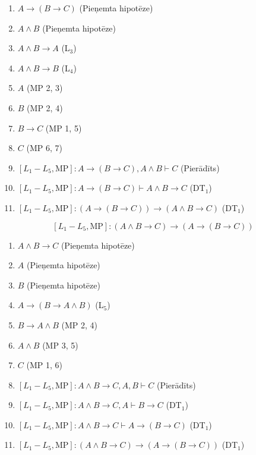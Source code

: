 \documentclass{article}
\begin{document}
\begin{enumerate}
    \item $ A \rightarrow (B \rightarrow C) $ \hfill (Pieņemta hipotēze)
    \item $ A \land B $ \hfill (Pieņemta hipotēze)
    \item $ A \land B \rightarrow A $ \hfill (L$_3$)
    \item $ A \land B \rightarrow B $ \hfill (L$_4$)
    \item $ A $ \hfill (MP 2, 3)
    \item $ B $ \hfill (MP 2, 4)
    \item $ B \rightarrow C $ \hfill (MP 1, 5)
    \item $ C $ \hfill (MP 6, 7)
    \item $ [L_1 - L_5, \text{MP}]: A \rightarrow (B \rightarrow C), A \land B \vdash C $ \hfill (Pierādīts)
    \item $ [L_1 - L_5, \text{MP}]: A \rightarrow (B \rightarrow C) \vdash A \land B \rightarrow C $ \hfill (DT$_1$)
    \item $ [L_1 - L_5, \text{MP}]: (A \rightarrow (B \rightarrow C)) \rightarrow (A \land B \rightarrow C) $ \hfill (DT$_1$)
\end{enumerate}

\[
    [L_1 - L_5, \text{MP}]: (A \land B \rightarrow C) \rightarrow (A \rightarrow (B \rightarrow C))
\]

\begin{enumerate}
    \item $ A \land B \rightarrow C $ \hfill (Pieņemta hipotēze)
    \item $ A $ \hfill (Pieņemta hipotēze)
    \item $ B $ \hfill (Pieņemta hipotēze)
    \item $ A \rightarrow ( B \rightarrow A \land B) $ \hfill (L$_5$)
    \item $ B \rightarrow A \land B $ \hfill (MP 2, 4)
    \item $ A \land B $ \hfill (MP 3, 5)
    \item $ C $ \hfill (MP 1, 6)
    \item $ [L_1 - L_5, \text{MP}]: A \land B \rightarrow C, A, B \vdash C $ \hfill (Pierādīts)
    \item $ [L_1 - L_5, \text{MP}]: A \land B \rightarrow C, A \vdash B \rightarrow C $ \hfill (DT$_1$)
    \item $ [L_1 - L_5, \text{MP}]: A \land B \rightarrow C \vdash A \rightarrow (B \rightarrow C) $ \hfill (DT$_1$)
    \item $ [L_1 - L_5, \text{MP}]: (A \land B \rightarrow C) \rightarrow (A \rightarrow (B \rightarrow C)) $ \hfill (DT$_1$)
\end{enumerate}
\end{document}
